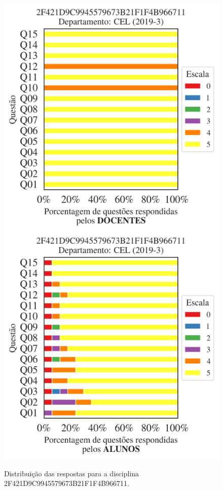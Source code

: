 \documentclass[a4paper,10pt]{article}
\begin{document}
\begin{figure}[h]
\centering
\includegraphics[width=0.485\linewidth]{analise_disciplina_departamento_CEL_2F421D9C9945579673B21F1F4B966711_docentes.png}
\includegraphics[width=0.485\linewidth]{analise_disciplina_departamento_CEL_2F421D9C9945579673B21F1F4B966711_alunos.png}
\caption{\label{fig:analise_geral_departamento}                Distribuição das respostas para a disciplina 2F421D9C9945579673B21F1F4B966711. }
\end{figure}
\end{document}
